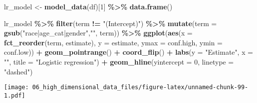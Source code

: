 \documentclass[
]{book}
\newenvironment{Shaded}{\begin{snugshade}}{\end{snugshade}}
\newcommand{\DataTypeTok}[1]{\textcolor[rgb]{0.13,0.29,0.53}{#1}}
\newcommand{\DecValTok}[1]{\textcolor[rgb]{0.00,0.00,0.81}{#1}}
\newcommand{\KeywordTok}[1]{\textcolor[rgb]{0.13,0.29,0.53}{\textbf{#1}}}
\newcommand{\NormalTok}[1]{#1}
\newcommand{\OperatorTok}[1]{\textcolor[rgb]{0.81,0.36,0.00}{\textbf{#1}}}
\newcommand{\StringTok}[1]{\textcolor[rgb]{0.31,0.60,0.02}{#1}}
\begin{document}
\begin{Shaded}
\begin{Highlighting}[]
\NormalTok{lr\_model \textless{}{-}}\StringTok{ }\KeywordTok{model\_data}\NormalTok{(df)[}\DecValTok{1}\NormalTok{] }\OperatorTok{\%\textgreater{}\%}\StringTok{ }
\StringTok{  }\KeywordTok{data.frame}\NormalTok{()}

\NormalTok{lr\_model }\OperatorTok{\%\textgreater{}\%}
\StringTok{  }\KeywordTok{filter}\NormalTok{(term }\OperatorTok{!=}\StringTok{ "(Intercept)"}\NormalTok{) }\OperatorTok{\%\textgreater{}\%}
\StringTok{  }\KeywordTok{mutate}\NormalTok{(}\DataTypeTok{term =} \KeywordTok{gsub}\NormalTok{(}\StringTok{"race|age\_cat|gender"}\NormalTok{,}\StringTok{""}\NormalTok{, term)) }\OperatorTok{\%\textgreater{}\%}
\StringTok{  }\KeywordTok{ggplot}\NormalTok{(}\KeywordTok{aes}\NormalTok{(}\DataTypeTok{x =} \KeywordTok{fct\_reorder}\NormalTok{(term, estimate), }\DataTypeTok{y =}\NormalTok{ estimate, }\DataTypeTok{ymax =}\NormalTok{ conf.high, }\DataTypeTok{ymin =}\NormalTok{ conf.low)) }\OperatorTok{+}
\StringTok{  }\KeywordTok{geom\_pointrange}\NormalTok{() }\OperatorTok{+}
\StringTok{  }\KeywordTok{coord\_flip}\NormalTok{() }\OperatorTok{+}
\StringTok{  }\KeywordTok{labs}\NormalTok{(}\DataTypeTok{y =} \StringTok{"Estimate"}\NormalTok{, }\DataTypeTok{x =} \StringTok{""}\NormalTok{,}
      \DataTypeTok{title =} \StringTok{"Logistic regression"}\NormalTok{) }\OperatorTok{+}
\StringTok{  }\KeywordTok{geom\_hline}\NormalTok{(}\DataTypeTok{yintercept =} \DecValTok{0}\NormalTok{, }\DataTypeTok{linetype =} \StringTok{"dashed"}\NormalTok{)}
\end{Highlighting}
\end{Shaded}

\texttt{[image: 06\_high\_dimensional\_data\_files/figure-latex/unnamed-chunk-99-1.pdf]}
\end{document}
